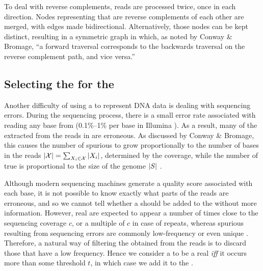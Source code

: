 To deal with reverse complements, reads are processed twice, once in each direction. Nodes representing  that are reverse complements of each other are merged, with edges made bidirectional. Alternatively, those nodes can be kept distinct, resulting in a symmetric graph in which, as noted by Conway \& Bromage, ``a forward traversal corresponds to the backwards traversal on the reverse complement path, and vice versa.'' \cite{Conway2011}

\subsection{Selecting the  for the \dBG}
\label{subsec:dBG-selectingkmers}

Another difficulty of using a \dBG to represent DNA data is dealing with sequencing errors. During the sequencing process, there is a small error rate associated with reading any base from  (0.1\%--1\% per base in Illumina \cite{Metzker2010}). As a result, many of the  extracted from the reads in \readset are erroneous. As discussed by Conway \& Bromage, this causes the number of spurious  to grow proportionally to the number of bases in the reads $|\readset|=\sum_{\strname{X}_i \in \readset} |\strname{X}_i|$, determined by the coverage, while the number of true  is proportional to the size of the genome $|\strname{S}|$ \cite{Conway2011}.

Although modern sequencing machines generate a quality score associated with each base, it is not possible to know exactly what parts of the reads are erroneous, and so we cannot tell whether a \kmer should be added to the \dBG without more information. However, real  are expected to appear a number of times close to the sequencing coverage $c$, or a multiple of $c$ in case of repeats, whereas spurious  resulting from sequencing errors are commonly low-frequency or even unique \cite{Conway2011, Zhang2014, Ghosh2019}. Therefore, a natural way of filtering the  obtained from the reads is to discard those that have a low frequency. Hence we consider a \kmer to be a real \kmer \emph{iff} it occurs more than some threshold $t$, in which case we add it to the \dBG.

